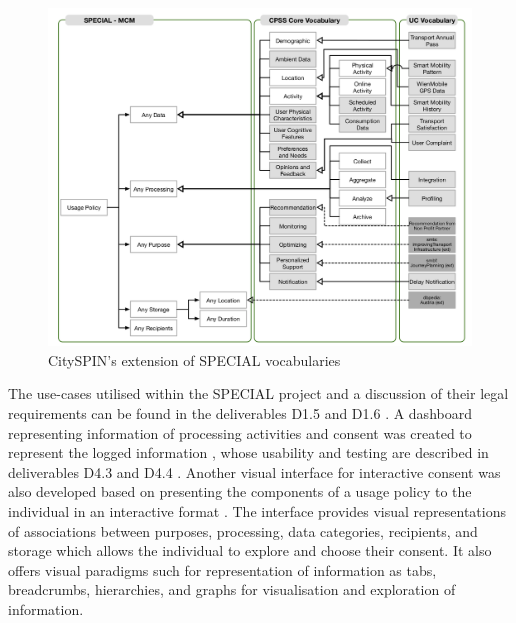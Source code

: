 \begin{figure}[htbp]
    \centering
    \includegraphics[width=0.8\linewidth]{img/SPECIAL_CitySPIN.png}
    \caption{CitySPIN's extension of SPECIAL vocabularies \cite{fernandez_user_2019}}
    \label{fig:SPECIAL-CitySPIN}
\end{figure}

The use-cases utilised within the SPECIAL project and a discussion of their legal requirements can be found in the deliverables D1.5 \cite{bonatti_d1.5_2018} and D1.6 \cite{schlehahn_d1.6_2018}. A dashboard representing information of processing activities and consent was created to represent the logged information \cite{raschke_designing_2017}, whose usability and testing are described in deliverables D4.3 \cite{raschke_d4.3_nodate} and D4.4 \cite{milosevic_d4.4_2019}. Another visual interface for interactive consent was also developed based on presenting the components of a usage policy to the individual in an interactive format \cite{gritzalis_i_2019}. The interface provides visual representations of associations between purposes, processing, data categories, recipients, and storage which allows the individual to explore and choose their consent. It also offers visual paradigms such for representation of information as tabs, breadcrumbs, hierarchies, and graphs for visualisation and exploration of information. 

